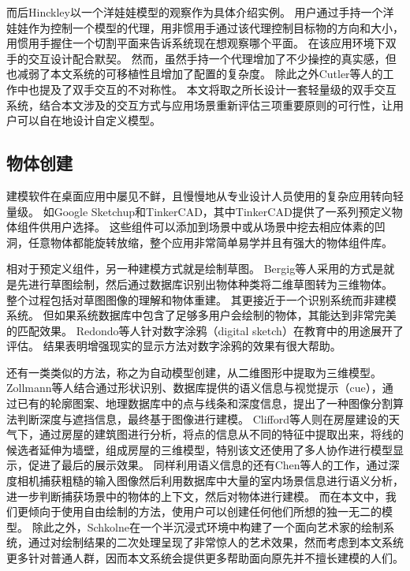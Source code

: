 而后Hinckley以一个洋娃娃模型的观察作为具体介绍实例。
用户通过手持一个洋娃娃作为控制一个模型的代理，用非惯用手通过该代理控制目标物的方向和大小，用惯用手握住一个切割平面来告诉系统现在想观察哪个平面。
在该应用环境下双手的交互设计配合默契。
然而，虽然手持一个代理增加了不少操控的真实感，但也减弱了本文系统的可移植性且增加了配置的复杂度。
除此之外Cutler等人的工作中也提及了双手交互的不对称性。
本文将取之所长设计一套轻量级的双手交互系统，结合本文涉及的交互方式与应用场景重新评估三项重要原则的可行性，让用户可以自在地设计自定义模型。

\subsection{物体创建}
\label{sec:related-create}
建模软件在桌面应用中屡见不鲜，且慢慢地从专业设计人员使用的复杂应用转向轻量级。
如Google Sketchup和TinkerCAD，其中TinkerCAD提供了一系列预定义物体组件供用户选择。
这些组件可以添加到场景中或从场景中挖去相应体素的凹洞，任意物体都能旋转放缩，整个应用非常简单易学并且有强大的物体组件库。

相对于预定义组件，另一种建模方式就是绘制草图。
Bergig等人采用的方式是就是先进行草图绘制，然后通过数据库识别出物体种类将二维草图转为三维物体。
整个过程包括对草图图像的理解和物体重建。
其更接近于一个识别系统而非建模系统。
但如果系统数据库中包含了足够多用户会绘制的物体，其能达到非常完美的匹配效果。
Redondo等人针对数字涂鸦（digital sketch）在教育中的用途展开了评估。
结果表明增强现实的显示方法对数字涂鸦的效果有很大帮助。

还有一类类似的方法，称之为自动模型创建，从二维图形中提取为三维模型。
Zollmann等人结合通过形状识别、数据库提供的语义信息与视觉提示（cue），通过已有的轮廓图案、地理数据库中的点与线条和深度信息，提出了一种图像分割算法判断深度与遮挡信息，最终基于图像进行建模。
Clifford等人则在房屋建设的天气下，通过房屋的建筑图进行分析，将点的信息从不同的特征中提取出来，将线的候选者延伸为墙壁，组成房屋的三维模型，特别该文还使用了多人协作进行模型显示，促进了最后的展示效果。
同样利用语义信息的还有Chen等人的工作，通过深度相机捕获粗糙的输入图像然后利用数据库中大量的室内场景信息进行语义分析，进一步判断捕获场景中的物体的上下文，然后对物体进行建模。
而在本文中，我们更倾向于使用自由绘制的方法，使用户可以创建任何他们所想的独一无二的模型。
除此之外，Schkolne在一个半沉浸式环境中构建了一个面向艺术家的绘制系统，通过对绘制结果的二次处理呈现了非常惊人的艺术效果，然而考虑到本文系统更多针对普通人群，因而本文系统会提供更多帮助面向原先并不擅长建模的人们。

